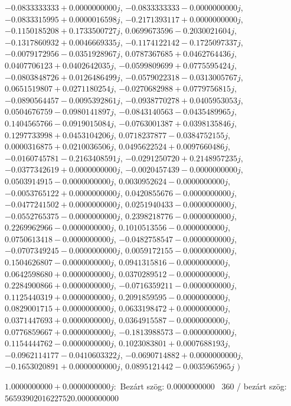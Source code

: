 \documentclass[14pt,a4paper]{article}
\begin{document}
\begin{itemize}
$-0.0833333333+0.0000000000j$, $-0.0833333333-0.0000000000j$, $-0.0833315995+0.0000016598j$, $-0.2171393117+0.0000000000j$, $-0.1150185208+0.1733500727j$, $0.0699673596-0.2030021604j$, $-0.1317860932+0.0046669335j$, $-0.1174122142-0.1725097337j$, $-0.0079172956-0.0351928967j$, $0.0787367685+0.0462764436j$, $0.0407706123+0.0402642035j$, $-0.0599809699+0.0775595424j$, $-0.0803848726+0.0126486499j$, $-0.0579022318-0.0313005767j$, $0.0651519807+0.0271180254j$, $-0.0270682988+0.0779756815j$, $-0.0890564457-0.0095392861j$, $-0.0938770278+0.0405953053j$, $0.0504676759-0.0980141897j$, $-0.0843140563-0.0435489965j$, $0.1404565766-0.0919015084j$, $-0.0763001387+0.0398135846j$, $0.1297733998+0.0453104206j$, $0.0718237877-0.0384752155j$, $0.0000316875+0.0210036506j$, $0.0495622524+0.0097660486j$, $-0.0160745781-0.2163408591j$, $-0.0291250720+0.2148957235j$, $-0.0377342619+0.0000000000j$, $-0.0020457439-0.0000000000j$, $0.0503914915-0.0000000000j$, $0.0030952624-0.0000000000j$, $-0.0053765122+0.0000000000j$, $0.0420855676-0.0000000000j$, $-0.0477241502+0.0000000000j$, $0.0251940433-0.0000000000j$, $-0.0552765375-0.0000000000j$, $0.2398218776-0.0000000000j$, $0.2269962966-0.0000000000j$, $0.1010513556-0.0000000000j$, $0.0750613418-0.0000000000j$, $-0.0482758547-0.0000000000j$, $-0.0707349245-0.0000000000j$, $0.0059172155-0.0000000000j$, $0.1504626807-0.0000000000j$, $0.0941315816-0.0000000000j$, $0.0642598680+0.0000000000j$, $0.0370289512-0.0000000000j$, $0.2284900866+0.0000000000j$, $-0.0716359211-0.0000000000j$, $0.1125440319+0.0000000000j$, $0.2091859595-0.0000000000j$, $0.0829001715+0.0000000000j$, $0.0633198472+0.0000000000j$, $0.0371447693+0.0000000000j$, $0.0364915587-0.0000000000j$, $0.0776859667+0.0000000000j$, $-0.1813988573-0.0000000000j$, $0.1154444762-0.0000000000j$, $0.1023083801+0.0007688193j$, $-0.0962114177-0.0410603322j$, $-0.0690714882+0.0000000000j$, $-0.1653020891+0.0000000000j$, $0.0895121442-0.0035965965j$
$\big)$
\end{itemize}
$1.0000000000+0.0000000000j$:\
Bezárt szög: $0.0000000000$ \
360 / bezárt szög: $56593902016227520.0000000000$\
\end{document}
